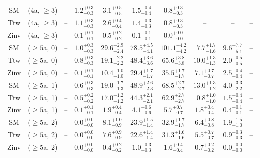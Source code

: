 \begin{table}[h!]
{\begin{tabular}{cccccccccc}
	SM & (4a, $\ge3$) & -- & $1.2^{+ 0.3 }_{- 0.3 }$ & $3.1^{+ 0.5 }_{- 0.5 }$ & $1.5^{+ 0.4 }_{- 0.4 }$ & $0.8^{+ 0.3 }_{- 0.3 }$ & -- & -- & -- \\[0.5ex] 
	Ttw & (4a, $\ge3$) & -- & $1.1^{+ 0.3 }_{- 0.3 }$ & $2.6^{+ 0.4 }_{- 0.4 }$ & $1.4^{+ 0.3 }_{- 0.3 }$ & $0.8^{+ 0.3 }_{- 0.3 }$ & -- & -- & -- \\[0.5ex] 
	Zinv & (4a, $\ge3$) & -- & $0.1^{+ 0.1 }_{- 0.1 }$ & $0.5^{+ 0.2 }_{- 0.2 }$ & $0.1^{+ 0.1 }_{- 0.1 }$ & $0.0^{+ 0.0 }_{- 0.0 }$ & -- & -- & -- \\[0.5ex] 
	SM & ($\ge5$a, 0) & -- & $1.0^{+ 0.3 }_{- 0.3 }$ & $29.6^{+ 2.9 }_{- 2.4 }$ & $78.5^{+ 4.5 }_{- 4.1 }$ & $101.1^{+ 4.2 }_{- 4.2 }$ & $17.7^{+ 1.7 }_{- 1.6 }$ & $9.6^{+ 7.7 }_{- 5.1 }$ & -- \\[0.5ex] 
	Ttw & ($\ge5$a, 0) & -- & $0.8^{+ 0.3 }_{- 0.3 }$ & $19.1^{+ 2.2 }_{- 2.2 }$ & $48.4^{+ 3.6 }_{- 3.6 }$ & $65.6^{+ 3.8 }_{- 3.8 }$ & $10.0^{+ 1.3 }_{- 1.3 }$ & $2.0^{+ 0.5 }_{- 0.5 }$ & -- \\[0.5ex] 
	Zinv & ($\ge5$a, 0) & -- & $0.1^{+ 0.1 }_{- 0.1 }$ & $10.4^{+ 1.0 }_{- 1.0 }$ & $29.4^{+ 1.7 }_{- 1.7 }$ & $35.5^{+ 1.7 }_{- 1.7 }$ & $7.1^{+ 0.7 }_{- 0.7 }$ & $2.5^{+ 0.4 }_{- 0.4 }$ & -- \\[0.5ex] 
	SM & ($\ge5$a, 1) & -- & $0.6^{+ 0.3 }_{- 0.3 }$ & $19.0^{+ 1.7 }_{- 1.3 }$ & $48.9^{+ 2.6 }_{- 2.3 }$ & $68.5^{+ 2.7 }_{- 2.7 }$ & $13.0^{+ 1.3 }_{- 1.2 }$ & $4.0^{+ 3.3 }_{- 2.2 }$ & -- \\[0.5ex] 
	Ttw & ($\ge5$a, 1) & -- & $0.5^{+ 0.2 }_{- 0.2 }$ & $17.0^{+ 1.2 }_{- 1.2 }$ & $44.3^{+ 2.1 }_{- 2.1 }$ & $62.9^{+ 2.7 }_{- 2.7 }$ & $10.8^{+ 1.0 }_{- 1.0 }$ & $1.5^{+ 0.4 }_{- 0.4 }$ & -- \\[0.5ex] 
	Zinv & ($\ge5$a, 1) & -- & $0.1^{+ 0.1 }_{- 0.1 }$ & $1.9^{+ 0.4 }_{- 0.4 }$ & $4.1^{+ 0.6 }_{- 0.6 }$ & $5.7^{+ 0.7 }_{- 0.7 }$ & $1.8^{+ 0.4 }_{- 0.4 }$ & $0.4^{+ 0.1 }_{- 0.1 }$ & -- \\[0.5ex] 
	SM & ($\ge5$a, 2) & -- & $0.0^{+ 0.0 }_{- 0.0 }$ & $8.1^{+ 1.0 }_{- 0.9 }$ & $23.9^{+ 1.5 }_{- 1.4 }$ & $32.9^{+ 1.7 }_{- 1.7 }$ & $6.4^{+ 0.8 }_{- 0.8 }$ & $1.9^{+ 1.5 }_{- 1.0 }$ & -- \\[0.5ex] 
	Ttw & ($\ge5$a, 2) & -- & $0.0^{+ 0.0 }_{- 0.0 }$ & $7.6^{+ 0.9 }_{- 0.9 }$ & $22.6^{+ 1.4 }_{- 1.4 }$ & $31.3^{+ 1.6 }_{- 1.6 }$ & $5.5^{+ 0.7 }_{- 0.7 }$ & $0.9^{+ 0.3 }_{- 0.3 }$ & -- \\[0.5ex] 
	Zinv & ($\ge5$a, 2) & -- & $0.0^{+ 0.0 }_{- 0.0 }$ & $0.4^{+ 0.2 }_{- 0.2 }$ & $1.0^{+ 0.3 }_{- 0.3 }$ & $1.6^{+ 0.4 }_{- 0.4 }$ & $0.7^{+ 0.2 }_{- 0.2 }$ & $0.0^{+ 0.0 }_{- 0.0 }$ & -- \\[0.5ex] 

\end{tabular}}
\end{table}
